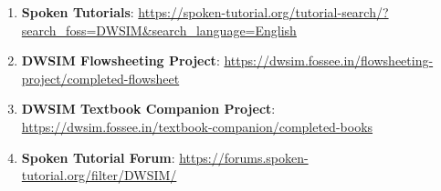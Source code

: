\documentclass[a4paper,12pt]{article}
\begin{document}
\begin{enumerate}

\item \textbf{Spoken Tutorials}: \url{https://spoken-tutorial.org/tutorial-search/?search_foss=DWSIM&search_language=English}
\item \textbf{DWSIM Flowsheeting Project}: \url{https://dwsim.fossee.in/flowsheeting-project/completed-flowsheet}
\item \textbf{DWSIM Textbook Companion Project}: \url{https://dwsim.fossee.in/textbook-companion/completed-books}
\item \textbf{Spoken Tutorial Forum}: \url{https://forums.spoken-tutorial.org/filter/DWSIM/}
\end{enumerate}
\end{document}
